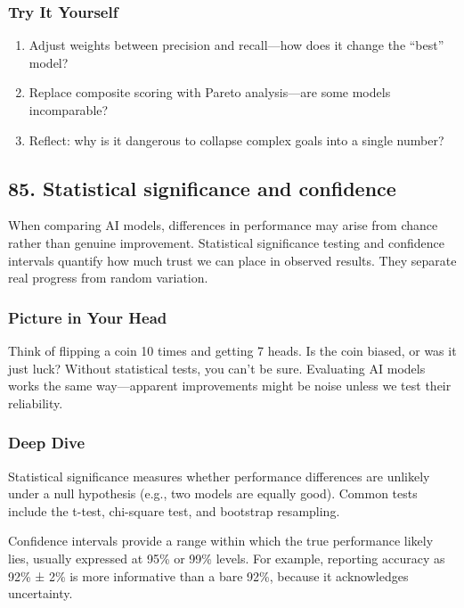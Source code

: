 \documentclass[
  letterpaper,
  DIV=11,
  numbers=noendperiod]{scrreprt}
\providecommand{\tightlist}{%
  \setlength{\itemsep}{0pt}\setlength{\parskip}{0pt}}
\begin{document}
\subsubsection{Try It Yourself}\label{try-it-yourself-83}

\begin{enumerate}
\def\labelenumi{\arabic{enumi}.}
\tightlist
\item
  Adjust weights between precision and recall---how does it change the
  ``best'' model?
\item
  Replace composite scoring with Pareto analysis---are some models
  incomparable?
\item
  Reflect: why is it dangerous to collapse complex goals into a single
  number?
\end{enumerate}

\subsection{85. Statistical significance and
confidence}\label{statistical-significance-and-confidence}

When comparing AI models, differences in performance may arise from
chance rather than genuine improvement. Statistical significance testing
and confidence intervals quantify how much trust we can place in
observed results. They separate real progress from random variation.

\subsubsection{Picture in Your Head}\label{picture-in-your-head-84}

Think of flipping a coin 10 times and getting 7 heads. Is the coin
biased, or was it just luck? Without statistical tests, you can't be
sure. Evaluating AI models works the same way---apparent improvements
might be noise unless we test their reliability.

\subsubsection{Deep Dive}\label{deep-dive-84}

Statistical significance measures whether performance differences are
unlikely under a null hypothesis (e.g., two models are equally good).
Common tests include the t-test, chi-square test, and bootstrap
resampling.

Confidence intervals provide a range within which the true performance
likely lies, usually expressed at 95\% or 99\% levels. For example,
reporting accuracy as 92\% ± 2\% is more informative than a bare 92\%,
because it acknowledges uncertainty.
\end{document}
